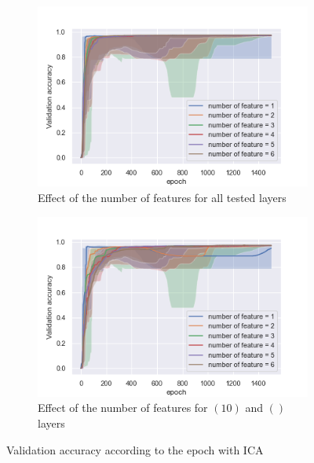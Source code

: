 \documentclass[twocolumn, 10pt]{article}
\begin{document}
			\begin{figure}[h]
				\centering
				\begin{subfigure}[t]{0.7\columnwidth}
					\centering
					\includegraphics[width=\linewidth]{../graphics/ICA_epoch_val_categorical_accuracy_number_of_feature.png}
					\caption{Effect of the number of features for all tested layers}
					\label{fig:per_ica_nf}
				\end{subfigure}
				\begin{subfigure}[t]{0.7\columnwidth}
					\centering
					\includegraphics[width=\linewidth]{../graphics/ICA_epoch_val_categorical_accuracy_number_of_feature_10_.png}
					\caption{Effect of the number of features for $(10)$ and $()$ layers}
					\label{fig:per_ica_nf_3525}
				\end{subfigure}
				\caption{Validation accuracy according to the epoch with ICA}
				\label{fig:per_ica}
			\end{figure}
\end{document}
